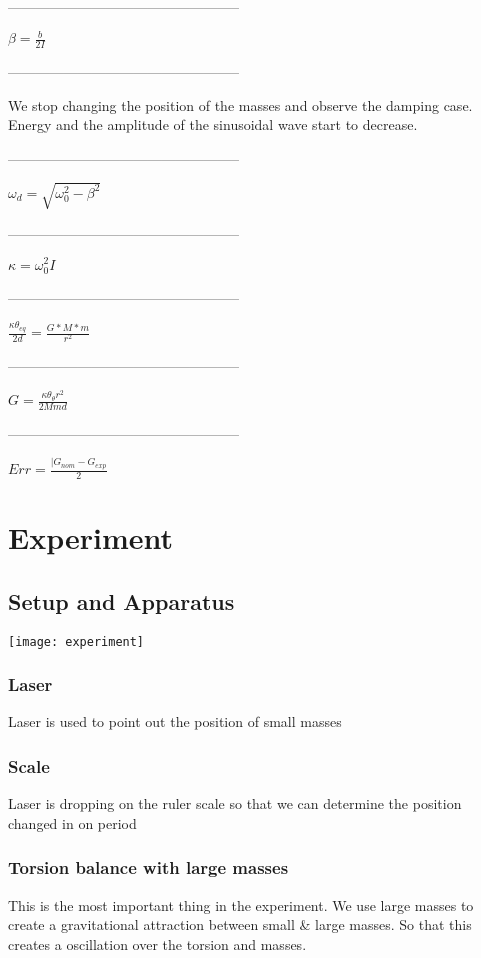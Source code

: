 \documentclass[12pt]{article}
\begin{document}
\begin{center}
\par
--------------------------------------------------
\par
$\beta = \frac{b}{2I}$
\par
--------------------------------------------------
\par
We stop changing the position of the masses and observe the damping case. Energy and the amplitude of
the sinusoidal wave start to decrease.
\par
--------------------------------------------------
\par
$\omega_{d} = \sqrt{\omega_{0}^2 - \beta^{2}}$
\par
--------------------------------------------------
\par
$\kappa = \omega_{0}^2 I$
\par
--------------------------------------------------
\par
$\frac{\kappa \theta_{eq}}{2 d} = \frac{G * M * m}{r^{2}}$
\par
--------------------------------------------------
\par
$G = \frac{\kappa \theta_{\theta} r^{2}}{2 M m d}$
\par
--------------------------------------------------
\par
$Err = \frac{|G_{nom} - G_{exp}}{2} $
\par
\end{center}
\section{Experiment}
\subsection{Setup and Apparatus}
\texttt{[image: experiment]}
\subsubsection{Laser}
Laser is used to point out the position of small masses
\subsubsection{Scale}
Laser is dropping on the ruler scale so that we can determine the position changed in on period
\subsubsection{Torsion balance with large masses}
This is the most important thing in the experiment. We use large masses to create a gravitational attraction between small & large masses. So that this creates a oscillation over the torsion and masses.
\end{document}
